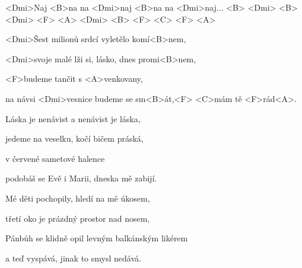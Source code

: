 
\zr

<Dmi>Naj <B>na na <Dmi>naj <B>na na <Dmi>naj... 
 <B> <Dmi> <B> <Dmi> <F> <A> <Dmi> 
 <B> <F> <C> <F> <A> 

\kr
\zs

<Dmi>Šest milionů srdcí vyletělo komí<B>nem,

<Dmi>svoje malé lži si, lásko, dnes promi<B>nem,

<F>budeme tančit s <A>venkovany,

na návsi <Dmi>vesnice budeme se sm<B>át,<F> <C>mám tě <F>rád<A>.

\ks

\zr \kr

\zs

Láska je nenávist a nenávist je láska,

jedeme na veselku, kočí bičem práská,

v červené sametové halence

podobáš se Evě i Marii, dneska mě zabijí.

\ks

\zr \kr

\zs

Mé děti pochopily, hledí na mě úkosem,

třetí oko je prázdný prostor nad nosem,

Pánbůh se klidně opil levným balkánským likérem

a teď vyspává, jinak to smysl nedává.

\ks

\zr
\kr

\kp
